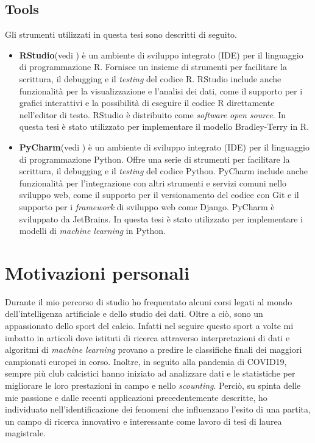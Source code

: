\begin{comment}
library(ggmosaic)
library(ggplot2)
library(gridExtra)
@article{marchiori2020secrets,
	title={Secrets of soccer: Neural network flows and game performance},
	author={Marchiori, Massimo and de Vecchi, Marco},
	journal={Computers \& Electrical Engineering},
	volume={81},
	pages={106505},
	year={2020},
	publisher={Elsevier}
}
\end{comment}

\subsection{Tools}
Gli strumenti utilizzati in questa tesi sono descritti di seguito.
\begin{itemize}
	\item \textbf{RStudio}(vedi \textit{\cite{rstudio}}) è un ambiente di sviluppo integrato (IDE) per il linguaggio di programmazione R. Fornisce un insieme di strumenti per facilitare la scrittura, il debugging e il \emph{testing} del codice R. RStudio include anche funzionalità per la visualizzazione e l'analisi dei dati, come il supporto per i grafici interattivi e la possibilità di eseguire il codice R direttamente nell'editor di testo. RStudio è distribuito come \emph{software} \emph{open source}. In questa tesi è stato utilizzato per implementare il modello Bradley-Terry in R.
	\item \textbf{PyCharm}(vedi \textit{\cite{pycharm}}) è un ambiente di sviluppo integrato (IDE) per il linguaggio di programmazione Python. Offre una serie di strumenti per facilitare la scrittura, il debugging e il \emph{testing} del codice Python. PyCharm include anche funzionalità per l'integrazione con altri strumenti e servizi comuni nello sviluppo web, come il supporto per il versionamento del codice con Git e il supporto per i \emph{framework} di sviluppo web come Django. PyCharm  è sviluppato da JetBrains. In questa tesi è stato utilizzato per implementare i modelli di \emph{machine learning} in Python.
\end{itemize}

\section{Motivazioni personali}
Durante il mio percorso di studio ho frequentato alcuni corsi legati al mondo dell'intelligenza artificiale e dello studio dei dati. Oltre a ciò, sono un appassionato dello sport del calcio. Infatti nel seguire questo sport a volte mi imbatto in articoli dove istituti di ricerca attraverso interpretazioni di dati e algoritmi di \emph{machine learning} provano a predire le classifiche finali dei maggiori campionati europei in corso. Inoltre, in seguito alla pandemia di COVID19, sempre più club calcistici hanno iniziato ad analizzare dati e le statistiche per migliorare le loro prestazioni in campo e nello \emph{scounting}. Perciò, su spinta delle mie passione e dalle recenti applicazioni precedentemente descritte, ho individuato nell'identificazione dei fenomeni che influenzano l'esito di una partita, un campo di ricerca innovativo e interessante come lavoro di tesi di laurea magistrale.
